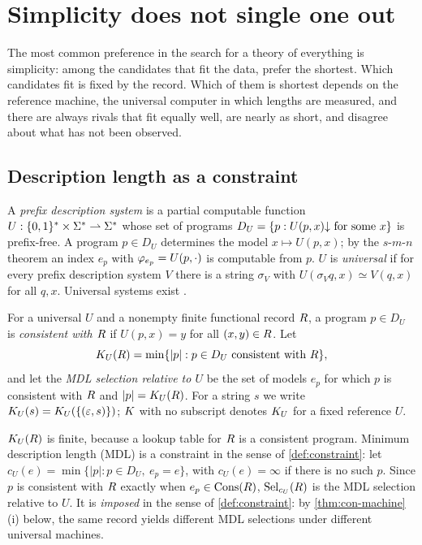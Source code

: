\section{Simplicity does not single one out}\label{sec:simplicity}

The most common preference in the search for a theory of everything is simplicity:
among the candidates that fit the data, prefer the shortest. Which candidates fit is
fixed by the record. Which of them is shortest depends on the reference machine, the
universal computer in which lengths are measured, and there are always rivals that fit
equally well, are nearly as short, and disagree about what has not been observed.

\subsection{Description length as a constraint}

\begin{definition}\label{con:def:prefix}
A \emph{prefix description system} is a partial computable function
$U:\{0,1\}^*\times\Sigma^{*}\rightharpoonup\Sigma^{*}$ whose set of programs
$D_U=\{p : U(p,x)\mathord{\downarrow} \text{ for some } x\}$ is prefix-free. A program
$p\in D_U$ determines the model $x\mapsto U(p,x)$; by the $s$-$m$-$n$ theorem an index
$e_p$ with $\varphi_{e_p}=U(p,\cdot)$ is computable from $p$. $U$ is \emph{universal} if
for every prefix description system $V$ there is a string $\sigma_V$ with
$U(\sigma_V q,x)\simeq V(q,x)$ for all $q,x$. Universal systems exist
\citep{chaitin1975,li-vitanyi2019}.
\end{definition}

\begin{definition}\label{con:def:KR}
For a universal $U$ and a nonempty finite functional record $R$, a program
$p\in D_U$ is \emph{consistent with $R$} if $U(p,x)=y$ for all $(x,y)\in R$.
Let
\[
  K_{U}(R)=\min\{|p| : p\in D_U \text{ consistent with } R\},
\]
and let the \emph{MDL selection relative to $U$} be the set of models $e_p$ for which
$p$ is consistent with $R$ and $|p|=K_{U}(R)$. For a string $s$ we write
$K_{U}(s)=K_{U}(\{(\varepsilon,s)\})$; $K$ with no subscript denotes $K_{U}$ for a
fixed reference $U$.
\end{definition}

$K_{U}(R)$ is finite, because a lookup table for $R$ is a consistent program.
Minimum description length (MDL) is a constraint in the sense of
\cref{def:constraint}: let $c_U(e)=\min\{|p| : p\in D_U,\ e_p=e\}$, with
$c_U(e)=\infty$ if there is no such $p$. Since $p$ is consistent with $R$ exactly
when $e_p\in\operatorname{Cons}(R)$, $\operatorname{Sel}_{c_U}(R)$ is the MDL selection relative to $U$. It is
\emph{imposed} in the sense of \cref{def:constraint}: by \cref{thm:con-machine}(i)
below, the same record yields different MDL selections under different universal
machines.

